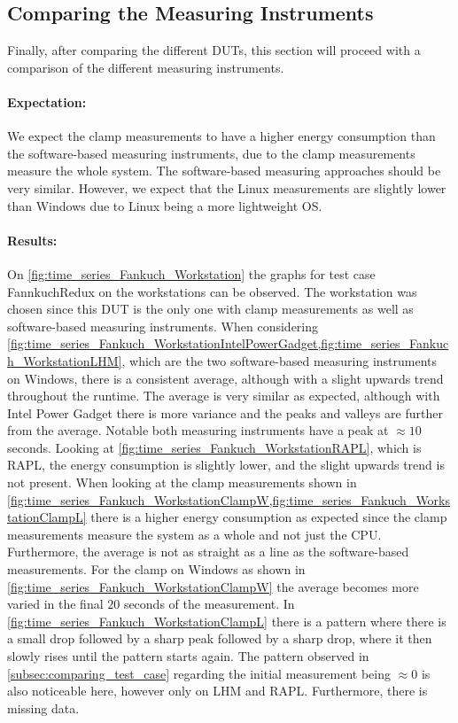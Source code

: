 
\subsection{Comparing the Measuring Instruments}
Finally, after comparing the different DUTs, this section will proceed with a comparison of the different measuring instruments.

\paragraph{Expectation:}
We expect the clamp measurements to have a higher energy consumption than the software-based measuring instruments, due to the clamp measurements measure the whole system. The software-based measuring approaches should be very similar. However, we expect that the Linux measurements are slightly lower than Windows due to Linux being a more lightweight OS.

\paragraph{Results:}
On \cref{fig:time_series_Fankuch_Workstation} the graphs for test case FannkuchRedux on the workstations can be observed. The workstation was chosen since this DUT is the only one with clamp measurements as well as software-based measuring instruments. When considering \cref{fig:time_series_Fankuch_WorkstationIntelPowerGadget,fig:time_series_Fankuch_WorkstationLHM}, which are the two software-based measuring instruments on Windows, there is a consistent average, although with a slight upwards trend throughout the runtime. The average is very similar as expected, although with Intel Power Gadget there is more variance and the peaks and valleys are further from the average. Notable both measuring instruments have a peak at $\approx10$ seconds. Looking at \cref{fig:time_series_Fankuch_WorkstationRAPL}, which is RAPL, the energy consumption is slightly lower, and the slight upwards trend is not present. When looking at the clamp measurements shown in \cref{fig:time_series_Fankuch_WorkstationClampW,fig:time_series_Fankuch_WorkstationClampL} there is a higher energy consumption as expected since the clamp measurements measure the system as a whole and not just the CPU. Furthermore, the average is not as straight as a line as the software-based measurements. For the clamp on Windows as shown in \cref{fig:time_series_Fankuch_WorkstationClampW} the average becomes more varied in the final $20$ seconds of the measurement. In \cref{fig:time_series_Fankuch_WorkstationClampL} there is a pattern where there is a small drop followed by a sharp peak followed by a sharp drop, where it then slowly rises until the pattern starts again. The pattern observed in \cref{subsec:comparing_test_case} regarding the initial measurement being $\approx0$ is also noticeable here, however only on LHM and RAPL. Furthermore, there is missing data.

